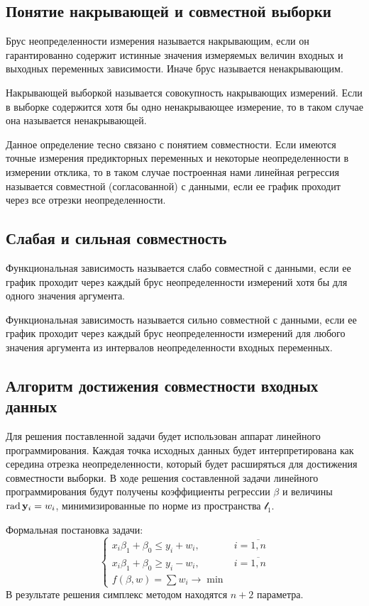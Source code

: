 \documentclass[a4paper]{article}
\begin{document}
\subsection{Понятие накрывающей и совместной выборки}
Брус неопределенности измерения называется накрывающим, если он гарантированно содержит истинные значения измеряемых величин входных и выходных переменных зависимости. Иначе брус называется ненакрывающим.

Накрывающей выборкой называется совокупность накрывающих измерений. Если в выборке содержится хотя бы одно ненакрывающее измерение, то в таком случае она называется ненакрывающей. 

Данное определение тесно связано с понятием совместности. Если имеются точные измерения предикторных переменных и некоторые неопределенности в измерении отклика, то в таком случае построенная нами линейная регрессия называется совместной (согласованной) с данными, если ее график проходит через все отрезки неопределенности. 
\subsection{Слабая и сильная совместность}
Функциональная зависимость называется слабо совместной с данными, если ее график проходит через каждый брус неопределенности измерений хотя бы для одного значения аргумента. 

Функциональная зависимость называется сильно совместной с данными, если ее график проходит через каждый брус неопределенности измерений для любого значения аргумента из интервалов неопределенности входных переменных.
\subsection{Алгоритм достижения совместности входных данных}
Для решения поставленной задачи будет использован аппарат линейного программирования. Каждая точка исходных данных будет интерпретирована как середина отрезка неопределенности, который будет расширяться для достижения совместности выборки. В ходе решения составленной задачи линейного программирования будут получены коэффициенты регрессии $\beta$ и величины $\operatorname{rad}{\mathbf{y}_i}=w_i$, минимизированные по норме из пространства $\mathcal{l}_1$. 

Формальная постановка задачи:
\begin{equation}\label{alg1}
\begin{cases}
        x_i\beta_1+\beta_0\leq y_i + w_i,& i=\overline{1,n}\\
        x_i\beta_1+\beta_0\geq y_i - w_i,& i=\overline{1,n}\\
        f(\beta,w)=\sum w_i\rightarrow \min        
\end{cases}
\end{equation}
В результате решения симплекс методом находятся $n+2$ параметра.
\end{document}
